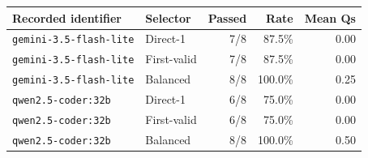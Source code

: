 \renewcommand{\arraystretch}{1.12}
\begin{tabular}{@{}llrrr@{}}
\toprule
Recorded identifier & Selector & Passed & Rate & Mean Qs \\ \midrule
\texttt{gemini-3.5-flash-lite} & Direct-1 & 7/8 & 87.5\% & 0.00 \\
\texttt{gemini-3.5-flash-lite} & First-valid & 7/8 & 87.5\% & 0.00 \\
\texttt{gemini-3.5-flash-lite} & Balanced & 8/8 & 100.0\% & 0.25 \\
\texttt{qwen2.5-coder:32b} & Direct-1 & 6/8 & 75.0\% & 0.00 \\
\texttt{qwen2.5-coder:32b} & First-valid & 6/8 & 75.0\% & 0.00 \\
\texttt{qwen2.5-coder:32b} & Balanced & 8/8 & 100.0\% & 0.50 \\
\bottomrule
\end{tabular}
